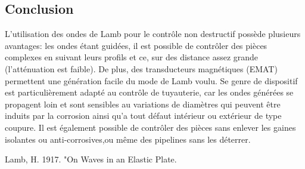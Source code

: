 \documentclass[twoside]{article}
\begin{document}
\begin{multicols}{2}
\section{Conclusion}
L'utilisation des ondes de Lamb pour le contrôle non destructif possède plusieurs avantages: les ondes étant guidées, il est possible de contrôler des pièces complexes en suivant leurs profils et ce, sur des distance assez grande (l'atténuation est faible). De plus, des transducteurs magnétiques (EMAT) permettent une génération facile du mode de Lamb voulu. Se genre de dispositif est particulièrement adapté au contrôle de tuyauterie, car les ondes générées se propagent loin et sont sensibles au variations de diamètres qui peuvent être induits par la corrosion ainsi qu'a tout défaut intérieur ou extérieur de type coupure. Il est également possible de contrôler des pièces sans enlever les gaines isolantes ou anti-corrosives,ou même des pipelines sans les déterrer.


\begin{thebibliography}{99} %

Lamb, H. 1917.
\newblock"On Waves in an Elastic Plate.
 
\end{thebibliography}


\end{multicols}
\end{document}
